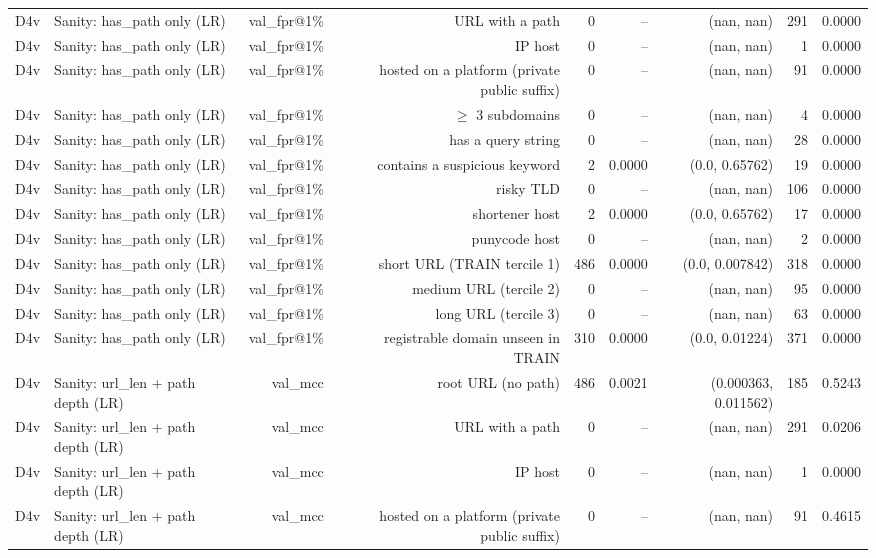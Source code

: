 \begin{table}[t]
\begin{tabular}{llrrrrrrr}
D4v & Sanity: has\_path only (LR) & val\_fpr@1\% & URL with a path & 0 & -- & (nan, nan) & 291 & 0.0000 \\
D4v & Sanity: has\_path only (LR) & val\_fpr@1\% & IP host & 0 & -- & (nan, nan) & 1 & 0.0000 \\
D4v & Sanity: has\_path only (LR) & val\_fpr@1\% & hosted on a platform (private public suffix) & 0 & -- & (nan, nan) & 91 & 0.0000 \\
D4v & Sanity: has\_path only (LR) & val\_fpr@1\% & $\geq$ 3 subdomains & 0 & -- & (nan, nan) & 4 & 0.0000 \\
D4v & Sanity: has\_path only (LR) & val\_fpr@1\% & has a query string & 0 & -- & (nan, nan) & 28 & 0.0000 \\
D4v & Sanity: has\_path only (LR) & val\_fpr@1\% & contains a suspicious keyword & 2 & 0.0000 & (0.0, 0.65762) & 19 & 0.0000 \\
D4v & Sanity: has\_path only (LR) & val\_fpr@1\% & risky TLD & 0 & -- & (nan, nan) & 106 & 0.0000 \\
D4v & Sanity: has\_path only (LR) & val\_fpr@1\% & shortener host & 2 & 0.0000 & (0.0, 0.65762) & 17 & 0.0000 \\
D4v & Sanity: has\_path only (LR) & val\_fpr@1\% & punycode host & 0 & -- & (nan, nan) & 2 & 0.0000 \\
D4v & Sanity: has\_path only (LR) & val\_fpr@1\% & short URL (TRAIN tercile 1) & 486 & 0.0000 & (0.0, 0.007842) & 318 & 0.0000 \\
D4v & Sanity: has\_path only (LR) & val\_fpr@1\% & medium URL (tercile 2) & 0 & -- & (nan, nan) & 95 & 0.0000 \\
D4v & Sanity: has\_path only (LR) & val\_fpr@1\% & long URL (tercile 3) & 0 & -- & (nan, nan) & 63 & 0.0000 \\
D4v & Sanity: has\_path only (LR) & val\_fpr@1\% & registrable domain unseen in TRAIN & 310 & 0.0000 & (0.0, 0.01224) & 371 & 0.0000 \\
D4v & Sanity: url\_len + path depth (LR) & val\_mcc & root URL (no path) & 486 & 0.0021 & (0.000363, 0.011562) & 185 & 0.5243 \\
D4v & Sanity: url\_len + path depth (LR) & val\_mcc & URL with a path & 0 & -- & (nan, nan) & 291 & 0.0206 \\
D4v & Sanity: url\_len + path depth (LR) & val\_mcc & IP host & 0 & -- & (nan, nan) & 1 & 0.0000 \\
D4v & Sanity: url\_len + path depth (LR) & val\_mcc & hosted on a platform (private public suffix) & 0 & -- & (nan, nan) & 91 & 0.4615 \\

\end{tabular}
\end{table}
